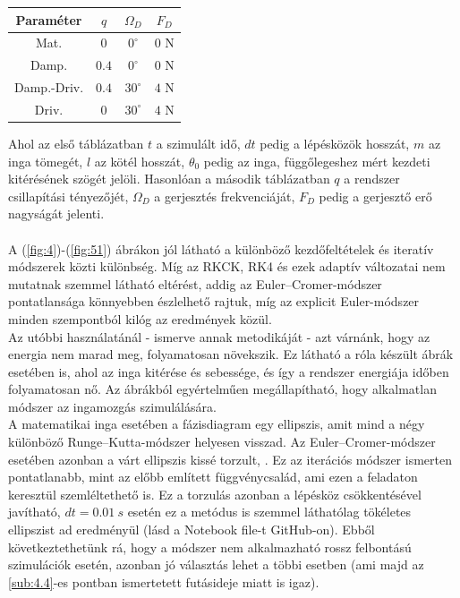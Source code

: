 \begin{multicols}{2}
\begin{center}
\begin{tabular}{c||c|c|c}
    \hline
    Paraméter    &  $q$   & $\Omega_{D}$  & $F_{D}$  \\ \hline\hline
    Mat.         & $0$    & $0^{\circ}$   & $0$ N    \\ \hline
    Damp.        & $0.4$  & $0^{\circ}$   & $0$ N    \\ \hline
    Damp.-Driv.  & $0.4$  & $30^{\circ}$  & $4$ N    \\ \hline
    Driv.        & $0$    & $30^{\circ}$  & $4$ N    \\ \hline
\end{tabular}
\end{center}
\label{tab2}
\hfill \break
Ahol az első táblázatban $t$ a szimulált idő, $dt$ pedig a lépésközök hosszát, $m$ az inga tömegét, $l$ az kötél hosszát, $\theta_{0}$ pedig az inga, függőlegeshez mért kezdeti kitérésének szögét jelöli. Hasonlóan a második táblázatban $q$ a rendszer csillapítási tényezőjét, $\Omega_{D}$ a gerjesztés frekvenciáját, $F_{D}$ pedig a gerjesztő erő nagyságát jelenti.
\\ \\
A (\ref{fig:4})-(\ref{fig:51}) ábrákon jól látható a különböző kezdőfeltételek és iteratív módszerek közti különbség. Míg az RKCK, RK4 és ezek adaptív változatai nem mutatnak szemmel látható eltérést, addig az Euler--Cromer-módszer pontatlansága könnyebben észlelhető rajtuk, míg az explicit Euler-módszer minden szempontból kilóg az eredmények közül. \\
Az utóbbi használatánál - ismerve annak metodikáját - azt várnánk, hogy az energia nem marad meg, folyamatosan növekszik. Ez látható a róla készült ábrák esetében is, ahol az inga kitérése és sebessége, és így a rendszer energiája időben folyamatosan nő. Az ábrákból egyértelműen megállapítható, hogy alkalmatlan módszer az ingamozgás szimulálására. \\
A matematikai inga esetében a fázisdiagram egy ellipszis, amit mind a négy különböző Runge--Kutta-módszer helyesen visszad. Az Euler--Cromer-módszer esetében azonban a várt ellipszis kissé torzult, . Ez az iterációs módszer ismerten pontatlanabb, mint az előbb említett függvénycsalád, ami ezen a feladaton keresztül szemléltethető is. Ez a torzulás azonban a lépésköz csökkentésével javítható, $dt = 0.01\ s$ esetén ez a metódus is szemmel láthatólag tökéletes ellipszist ad eredményül (lásd a Notebook file-t GitHub-on\cite{github}). Ebből következtethetünk rá, hogy a módszer nem alkalmazható rossz felbontású szimulációk esetén, azonban jó választás lehet a többi esetben (ami majd az \ref{sub:4.4}-es pontban ismertetett futásideje miatt is igaz).


\end{multicols}
